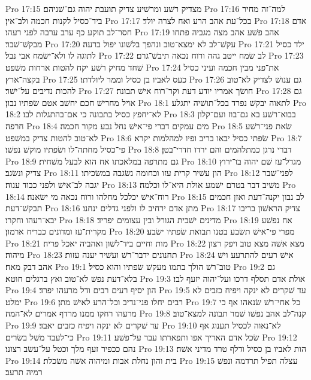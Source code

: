 Pro 17:15  מצדיק רשׁע ומרשׁיע צדיק תועבת יהוה גם־שׁניהם׃
Pro 17:16  למה־זה מחיר ביד־כסיל לקנות חכמה ולב־אין׃
Pro 17:17  בכל־עת אהב הרע ואח לצרה יולד׃
Pro 17:18  אדם חסר־לב תוקע כף ערב ערבה לפני רעהו׃
Pro 17:19  אהב פשׁע אהב מצה מגביה פתחו מבקשׁ־שׁבר׃
Pro 17:20  עקשׁ־לב לא ימצא־טוב ונהפך בלשׁונו יפול ברעה׃
Pro 17:21  ילד כסיל לתוגה לו ולא־ישׂמח אבי נבל׃
Pro 17:22  לב שׂמח ייטב גהה ורוח נכאה תיבשׁ־גרם׃
Pro 17:23  שׁחד מחיק רשׁע יקח להטות ארחות משׁפט׃
Pro 17:24  את־פני מבין חכמה ועיני כסיל בקצה־ארץ׃
Pro 17:25  כעס לאביו בן כסיל וממר ליולדתו׃
Pro 17:26  גם ענושׁ לצדיק לא־טוב להכות נדיבים על־ישׁר׃
Pro 17:27  חושׂך אמריו יודע דעת וקר־רוח אישׁ תבונה׃
Pro 17:28  גם אויל מחרישׁ חכם יחשׁב אטם שׂפתיו נבון׃
Pro 18:1  לתאוה יבקשׁ נפרד בכל־תושׁיה יתגלע׃
Pro 18:2  לא־יחפץ כסיל בתבונה כי אם־בהתגלות לבו׃
Pro 18:3  בבוא־רשׁע בא גם־בוז ועם־קלון חרפה׃
Pro 18:4  מים עמקים דברי פי־אישׁ נחל נבע מקור חכמה׃
Pro 18:5  שׂאת פני־רשׁע לא־טוב להטות צדיק במשׁפט׃
Pro 18:6  שׂפתי כסיל יבאו בריב ופיו למהלמות יקרא׃
Pro 18:7  פי־כסיל מחתה־לו ושׂפתיו מוקשׁ נפשׁו׃
Pro 18:8  דברי נרגן כמתלהמים והם ירדו חדרי־בטן׃
Pro 18:9  גם מתרפה במלאכתו אח הוא לבעל משׁחית׃
Pro 18:10  מגדל־עז שׁם יהוה בו־ירוץ צדיק ונשׂגב׃
Pro 18:11  הון עשׁיר קרית עזו וכחומה נשׂגבה במשׂכיתו׃
Pro 18:12  לפני־שׁבר יגבה לב־אישׁ ולפני כבוד ענוה׃
Pro 18:13  משׁיב דבר בטרם ישׁמע אולת היא־לו וכלמה׃
Pro 18:14  רוח־אישׁ יכלכל מחלהו ורוח נכאה מי ישׂאנה׃
Pro 18:15  לב נבון יקנה־דעת ואזן חכמים תבקשׁ־דעת׃
Pro 18:16  מתן אדם ירחיב לו ולפני גדלים ינחנו׃
Pro 18:17  צדיק הראשׁון בריבו יבא־רעהו וחקרו׃
Pro 18:18  מדינים ישׁבית הגורל ובין עצומים יפריד׃
Pro 18:19  אח נפשׁע מקרית־עז ומדונים כבריח ארמון׃
Pro 18:20  מפרי פי־אישׁ תשׂבע בטנו תבואת שׂפתיו ישׂבע׃
Pro 18:21  מות וחיים ביד־לשׁון ואהביה יאכל פריה׃
Pro 18:22  מצא אשׁה מצא טוב ויפק רצון מיהוה׃
Pro 18:23  תחנונים ידבר־רשׁ ועשׁיר יענה עזות׃
Pro 18:24  אישׁ רעים להתרעע וישׁ אהב דבק מאח׃
Pro 19:1  טוב־רשׁ הולך בתמו מעקשׁ שׂפתיו והוא כסיל׃
Pro 19:2  גם בלא־דעת נפשׁ לא־טוב ואץ ברגלים חוטא׃
Pro 19:3  אולת אדם תסלף דרכו ועל־יהוה יזעף לבו׃
Pro 19:4  הון יסיף רעים רבים ודל מרעהו יפרד׃
Pro 19:5  עד שׁקרים לא ינקה ויפיח כזבים לא ימלט׃
Pro 19:6  רבים יחלו פני־נדיב וכל־הרע לאישׁ מתן׃
Pro 19:7  כל אחי־רשׁ שׂנאהו אף כי מרעהו רחקו ממנו מרדף אמרים לא־המה׃
Pro 19:8  קנה־לב אהב נפשׁו שׁמר תבונה למצא־טוב׃
Pro 19:9  עד שׁקרים לא ינקה ויפיח כזבים יאבד׃
Pro 19:10  לא־נאוה לכסיל תענוג אף כי־לעבד משׁל בשׂרים׃
Pro 19:11  שׂכל אדם האריך אפו ותפארתו עבר על־פשׁע׃
Pro 19:12  נהם ככפיר זעף מלך וכטל על־עשׂב רצונו׃
Pro 19:13  הות לאביו בן כסיל ודלף טרד מדיני אשׁה׃
Pro 19:14  בית והון נחלת אבות ומיהוה אשׁה משׂכלת׃
Pro 19:15  עצלה תפיל תרדמה ונפשׁ רמיה תרעב׃
